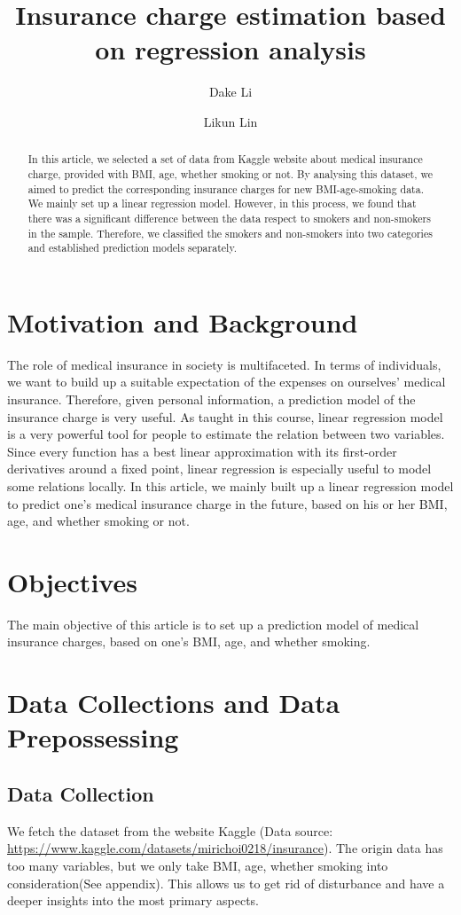 \documentclass[12pt,a4paper]{article}
\title{Insurance charge estimation based on regression analysis}
\author[1]{Dake Li}
\author[2]{Likun Lin}
\affil[1]{Department of Mathematics, Fudan University}
\affil[2]{Department of Mathematics, City University of Hong Kong}
\begin{document}
\maketitle


\begin{abstract}
In this article, we selected a set of data from Kaggle website about medical insurance charge, provided with BMI, age, whether smoking or not. By analysing this dataset, we aimed to predict the corresponding insurance charges for new BMI-age-smoking data. We mainly set up a linear regression model. However, in this process, we found that there was a significant difference between the data respect to smokers and non-smokers in the sample. Therefore, we classified the smokers and non-smokers into two categories and established prediction models separately.
\end{abstract}

\section{Motivation and Background}
The role of medical insurance in society is multifaceted. In terms of individuals, we want to build up a suitable expectation of the expenses on ourselves' medical insurance. Therefore, given personal information, a prediction model of the insurance charge is very useful. As taught in this course, linear regression model is a very powerful tool for people to estimate the relation between two variables. Since every function has a best linear approximation with its first-order derivatives around a fixed point, linear regression is especially useful to model some relations locally. In this article, we mainly built up a linear regression model to predict one's medical insurance charge in the future, based on his or her BMI, age, and whether smoking or not.

\section{Objectives}
The main objective of this article is to set up a prediction model of medical insurance charges, based on one's BMI, age, and whether smoking.

\section{Data Collections and Data Prepossessing}
\subsection{Data Collection}
We fetch the dataset from the website Kaggle (Data source: \url{https://www.kaggle.com/datasets/mirichoi0218/insurance}). The origin data has too many variables, but we only take BMI, age, whether smoking into consideration(See appendix). This allows us to get rid of disturbance and have a deeper insights into the most primary aspects.
 
\end{document}

